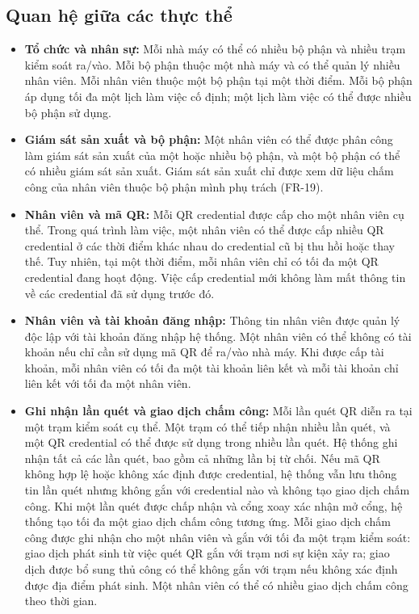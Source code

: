 \subsection{Quan hệ giữa các thực thể}\label{sec:entity-relations}
\begin{itemize}
    \item \textbf{Tổ chức và nhân sự:} Mỗi nhà máy có thể có nhiều bộ phận và nhiều trạm kiểm soát ra/vào. Mỗi bộ phận thuộc một nhà máy và có thể quản lý nhiều nhân viên. Mỗi nhân viên thuộc một bộ phận tại một thời điểm. Mỗi bộ phận áp dụng tối đa một lịch làm việc cố định; một lịch làm việc có thể được nhiều bộ phận sử dụng.
    \item \textbf{Giám sát sản xuất và bộ phận:} Một nhân viên có thể được phân công làm giám sát sản xuất của một hoặc nhiều bộ phận, và một bộ phận có thể có nhiều giám sát sản xuất. Giám sát sản xuất chỉ được xem dữ liệu chấm công của nhân viên thuộc bộ phận mình phụ trách (FR-19).
    \item \textbf{Nhân viên và mã QR:} Mỗi QR credential được cấp cho một nhân viên cụ thể. Trong quá trình làm việc, một nhân viên có thể được cấp nhiều QR credential ở các thời điểm khác nhau do credential cũ bị thu hồi hoặc thay thế. Tuy nhiên, tại một thời điểm, mỗi nhân viên chỉ có tối đa một QR credential đang hoạt động. Việc cấp credential mới không làm mất thông tin về các credential đã sử dụng trước đó.
    \item \textbf{Nhân viên và tài khoản đăng nhập:} Thông tin nhân viên được quản lý độc lập với tài khoản đăng nhập hệ thống. Một nhân viên có thể không có tài khoản nếu chỉ cần sử dụng mã QR để ra/vào nhà máy. Khi được cấp tài khoản, mỗi nhân viên có tối đa một tài khoản liên kết và mỗi tài khoản chỉ liên kết với tối đa một nhân viên.
    \item \textbf{Ghi nhận lần quét và giao dịch chấm công:} Mỗi lần quét QR diễn ra tại một trạm kiểm soát cụ thể. Một trạm có thể tiếp nhận nhiều lần quét, và một QR credential có thể được sử dụng trong nhiều lần quét. Hệ thống ghi nhận tất cả các lần quét, bao gồm cả những lần bị từ chối. Nếu mã QR không hợp lệ hoặc không xác định được credential, hệ thống vẫn lưu thông tin lần quét nhưng không gắn với credential nào và không tạo giao dịch chấm công. Khi một lần quét được chấp nhận và cổng xoay xác nhận mở cổng, hệ thống tạo tối đa một giao dịch chấm công tương ứng. Mỗi giao dịch chấm công được ghi nhận cho một nhân viên và gắn với tối đa một trạm kiểm soát: giao dịch phát sinh từ việc quét QR gắn với trạm nơi sự kiện xảy ra; giao dịch được bổ sung thủ công có thể không gắn với trạm nếu không xác định được địa điểm phát sinh. Một nhân viên có thể có nhiều giao dịch chấm công theo thời gian.

\end{itemize}
